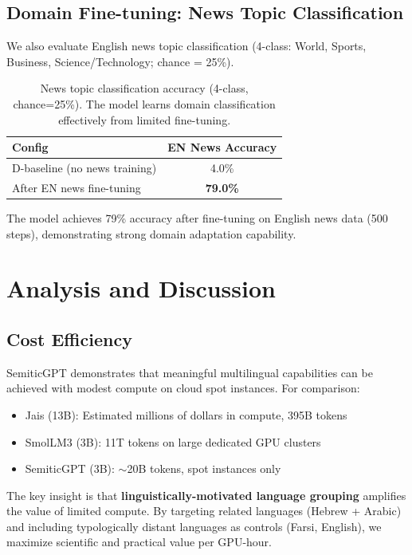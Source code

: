 \documentclass[10pt,twocolumn]{article}
\begin{document}
\subsection{Domain Fine-tuning: News Topic Classification}

We also evaluate English news topic classification (4-class: World, Sports, Business, Science/Technology; chance = 25\%).

\begin{table}[H]
\centering\small
\begin{tabular}{lc}
\toprule
\textbf{Config} & \textbf{EN News Accuracy} \\
\midrule
D-baseline (no news training) & 4.0\% \\
After EN news fine-tuning & \textbf{79.0\%} \\
\bottomrule
\end{tabular}
\caption{News topic classification accuracy (4-class, chance=25\%). The model learns domain classification effectively from limited fine-tuning.}
\label{tab:news}
\end{table}

The model achieves 79\% accuracy after fine-tuning on English news data (500 steps), demonstrating strong domain adaptation capability.

\section{Analysis and Discussion}

\subsection{Cost Efficiency}

SemiticGPT demonstrates that meaningful multilingual capabilities can be achieved with modest compute on cloud spot instances. For comparison:

\begin{itemize}
    \item Jais (13B): Estimated millions of dollars in compute, 395B tokens
    \item SmolLM3 (3B): 11T tokens on large dedicated GPU clusters
    \item SemiticGPT (3B): $\sim$20B tokens, spot instances only
\end{itemize}

The key insight is that \textbf{linguistically-motivated language grouping} amplifies the value of limited compute. By targeting related languages (Hebrew + Arabic) and including typologically distant languages as controls (Farsi, English), we maximize scientific and practical value per GPU-hour.
\end{document}
